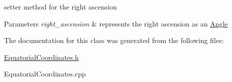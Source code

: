 setter method for the right ascension 


\begin{DoxyParams}{Parameters}
{\em right\+\_\+ascension} & represents the right ascension as an \mbox{\hyperlink{classAngle}{Angle}} \\
\hline
\end{DoxyParams}


The documentation for this class was generated from the following files\+:\begin{DoxyCompactItemize}
\item 
\mbox{\hyperlink{EquatorialCoordinates_8h}{Equatorial\+Coordinates.\+h}}\item 
Equatorial\+Coordinates.\+cpp\end{DoxyCompactItemize}
